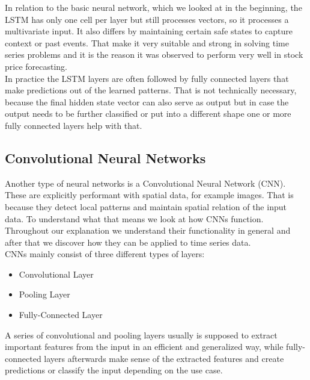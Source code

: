 \documentclass[a4paper,12pt]{report}
\begin{document}
In relation to the basic neural network, which we looked at in the beginning, the LSTM has only one cell per layer but still processes vectors, so it processes a multivariate input. It also differs by maintaining certain safe states to capture context or past events. That make it very suitable and strong in solving time series problems and it is the reason it was observed to perform very well in stock price forecasting.\\
In practice the LSTM layers are often followed by fully connected layers that make predictions out of the learned patterns. That is not technically necessary, because the final hidden state vector can also serve as output but in case the output needs to be further classified or put into a different shape one or more fully connected layers help with that.



	
	\subsection{Convolutional Neural Networks}
	Another type of neural networks is a Convolutional Neural Network (CNN). These are explicitly performant with spatial data, for example images. That is because they detect local patterns and maintain spatial relation of the input data. To understand what that means we look at how CNNs function. Throughout our explanation we understand their functionality in general and after that we discover how they can be applied to time series data. \\

	CNNs mainly consist of three different types of layers:
\begin{itemize}
  \item Convolutional Layer
  \item Pooling Layer
  \item Fully-Connected Layer
\end{itemize}
A series of convolutional and pooling layers usually is supposed to extract important features from the input in an efficient and generalized way, while fully-connected layers afterwards make sense of the extracted features and create predictions or classify the input depending on the use case.
\end{document}
